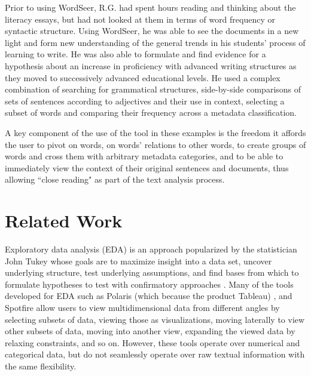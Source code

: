 \documentclass{sig-alternate}
\begin{document}
Prior to using WordSeer, R.G. had spent hours reading and thinking about the literacy essays, but had not looked at them in terms of word frequency or syntactic structure.  Using WordSeer, he was able to see the documents in a new light and form new  understanding of the general trends in his students' process of learning to write.   He was also able to formulate and find evidence for a hypothesis about an increase in proficiency with advanced writing structures as they moved to successively advanced educational levels.   He used a complex combination of searching for grammatical structures, side-by-side comparisons of sets of sentences according to adjectives and their use in context, selecting a subset of words and comparing their frequency across a metadata classification.  

A key component of the use of the tool in these examples is the freedom it affords the user to pivot on words, on words' relations to other words, to create groups of words and cross them with arbitrary metadata categories, and to be able to immediately view  the context of their original sentences and documents, thus allowing ``close reading" as part of the text analysis process.

\section{Related Work}

Exploratory data analysis  (EDA) is an approach popularized by the statistician John Tukey whose goals are to maximize insight into a data set, uncover underlying structure, test underlying assumptions, and find bases from which to formulate hypotheses to test with confirmatory approaches \cite{tukey1977exploratory,tukey1980we}.  Many of the tools developed for EDA such as Polaris (which because the product Tableau) \cite{stolte2002polaris}, and Spotfire \cite{ahlberg1996spotfire} allow users to view multidimensional data from different angles by selecting subsets of data, viewing those as visualizations, moving laterally to view other subsets of data, moving into another view, expanding the viewed data by relaxing constraints, and so on.  However, these tools operate over numerical and categorical data, but do not seamlessly operate over raw textual information with the same flexibility. 
\end{document}
